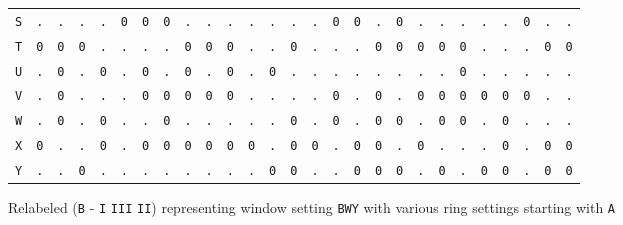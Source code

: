 \begin{figure}[H]
\begin{center}
{\begin{tabular}{c|cccccccccccccccccccccccccc}
				\texttt{S} & \texttt{.} & \texttt{.} & \texttt{.} & \texttt{.} & \texttt{0} & \texttt{0} & \texttt{0} & \texttt{.} & \texttt{.} & \texttt{.} & \texttt{.} & \texttt{.} & \texttt{.} & \texttt{.} & \texttt{0} & \texttt{0} & \texttt{.} & \texttt{0} & \texttt{.} & \texttt{.} & \texttt{.} & \texttt{.} & \texttt{.} & \texttt{0} & \texttt{.} & \texttt{.} \\
				\texttt{T} & \texttt{0} & \texttt{0} & \texttt{0} & \texttt{.} & \texttt{.} & \texttt{.} & \texttt{.} & \texttt{0} & \texttt{0} & \texttt{0} & \texttt{.} & \texttt{.} & \texttt{0} & \texttt{.} & \texttt{.} & \texttt{.} & \texttt{0} & \texttt{0} & \texttt{0} & \texttt{0} & \texttt{0} & \texttt{.} & \texttt{.} & \texttt{.} & \texttt{0} & \texttt{0} \\
				\texttt{U} & \texttt{.} & \texttt{0} & \texttt{.} & \texttt{0} & \texttt{.} & \texttt{0} & \texttt{.} & \texttt{0} & \texttt{.} & \texttt{0} & \texttt{.} & \texttt{0} & \texttt{.} & \texttt{.} & \texttt{.} & \texttt{.} & \texttt{.} & \texttt{.} & \texttt{.} & \texttt{.} & \texttt{0} & \texttt{.} & \texttt{.} & \texttt{.} & \texttt{.} & \texttt{.} \\
				\texttt{V} & \texttt{.} & \texttt{0} & \texttt{.} & \texttt{.} & \texttt{.} & \texttt{0} & \texttt{0} & \texttt{0} & \texttt{0} & \texttt{0} & \texttt{.} & \texttt{.} & \texttt{.} & \texttt{.} & \texttt{0} & \texttt{.} & \texttt{0} & \texttt{.} & \texttt{0} & \texttt{0} & \texttt{0} & \texttt{0} & \texttt{0} & \texttt{0} & \texttt{.} & \texttt{.} \\
				\texttt{W} & \texttt{.} & \texttt{0} & \texttt{.} & \texttt{0} & \texttt{.} & \texttt{.} & \texttt{0} & \texttt{.} & \texttt{.} & \texttt{.} & \texttt{.} & \texttt{.} & \texttt{0} & \texttt{.} & \texttt{0} & \texttt{.} & \texttt{0} & \texttt{0} & \texttt{.} & \texttt{0} & \texttt{0} & \texttt{.} & \texttt{0} & \texttt{.} & \texttt{.} & \texttt{.} \\
				\texttt{X} & \texttt{0} & \texttt{.} & \texttt{.} & \texttt{0} & \texttt{.} & \texttt{0} & \texttt{0} & \texttt{0} & \texttt{0} & \texttt{0} & \texttt{0} & \texttt{.} & \texttt{0} & \texttt{0} & \texttt{.} & \texttt{0} & \texttt{0} & \texttt{.} & \texttt{0} & \texttt{.} & \texttt{.} & \texttt{.} & \texttt{0} & \texttt{.} & \texttt{0} & \texttt{0} \\
				\texttt{Y} & \texttt{.} & \texttt{.} & \texttt{0} & \texttt{.} & \texttt{.} & \texttt{.} & \texttt{.} & \texttt{.} & \texttt{.} & \texttt{.} & \texttt{.} & \texttt{0} & \texttt{0} & \texttt{.} & \texttt{.} & \texttt{0} & \texttt{0} & \texttt{0} & \texttt{.} & \texttt{0} & \texttt{.} & \texttt{0} & \texttt{0} & \texttt{.} & \texttt{0} & \texttt{0} \\
			\end{tabular}}
	\end{center}
	\caption{Relabeled (\texttt{B} - \texttt{I} \texttt{III} \texttt{II}) representing window setting \texttt{BWY} with various ring settings starting with \texttt{A}}
	\label{fig:zygalski_sheet_ring}
\end{figure}
